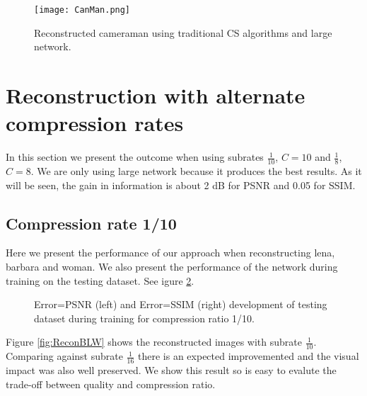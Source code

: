 \begin{figure}[!htb] 
\centering 
\texttt{[image: CanMan.png]}
\caption[Reconstructed cameraman with traditional methods]{Reconstructed cameraman using traditional CS algorithms and large network.}
\label{fig:Canman1} 
\end{figure} 

\FloatBarrier

\section{Reconstruction with alternate compression rates}

In this section we present the outcome when using subrates $\frac{1}{10}$, $C=10$ and $\frac{1}{8}$, $C=8$. We are only using large network because it produces the best results. As it will be seen, the gain in information is about 2 dB for PSNR and 0.05 for SSIM.  

\subsection{Compression rate 1/10}

Here we present the performance of our approach when reconstructing lena, barbara and woman. We also present the performance of the network during training on the testing dataset. See igure \ref{fig:trainTestsub1-10}. 

\begin{figure}[!htb] 
\centering 
{} 
\caption[PSNR and SSIM traning for compression ratio 1/10.]{\color{red}Error=PSNR \color{black}(left) and \color{red}Error=SSIM \color{black}(right) development of testing dataset during training for compression ratio 1/10.}
\label{fig:trainTestsub1-10}
\end{figure}

Figure \ref{fig:ReconBLW} shows the reconstructed images with subrate $\frac{1}{10}$. Comparing against subrate $\frac{1}{16}$ there is an expected improvemented and the visual impact was also well preserved. We show this result so is easy to evalute the trade-off between quality and compression ratio. 



